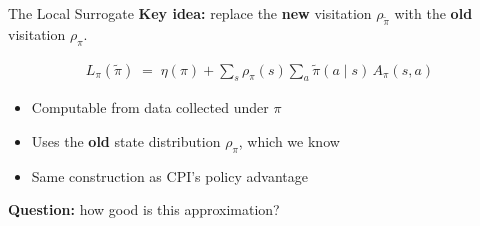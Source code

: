\documentclass[aspectratio=169]{beamer}
\begin{document}
\begin{frame}{The Local Surrogate}
  \textbf{Key idea:} replace the \textbf{new} visitation $\rho_{\tilde\pi}$ with the \textbf{old} visitation $\rho_\pi$.

  \vspace{8pt}
  \begin{formulabox}
    \begin{gather*}
      L_\pi(\tilde\pi) \;=\; \eta(\pi) + \sum_s \rho_{\pi}(s) \sum_a \tilde\pi(a\mid s)\, A_\pi(s,a)
    \end{gather*}
  \end{formulabox}

  \vspace{12pt}
  \begin{itemize}
    \item Computable from data collected under $\pi$
    \item Uses the \textbf{old} state distribution $\rho_\pi$, which we know
    \item Same construction as CPI's policy advantage
  \end{itemize}

  \vspace{12pt}
  \textbf{Question:} how good is this approximation?

\end{frame}
\end{document}
